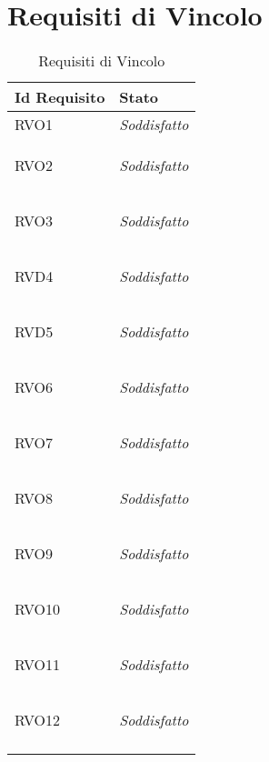 \section{Requisiti di Vincolo}
\normalsize
\begin{longtable}{|>{\centering}m{5cm}|m{5cm}<{\centering}|}
    \hline
    \textbf{Id Requisito} & \textbf{Stato}\\
    \hline
    \endhead
    \hypertarget{RVO1}{RVO1} & \textit{Soddisfatto}\\ \hline
   
    \hypertarget{RVO2}{RVO2} & \textit{Soddisfatto}\\ \hline
   
    \hypertarget{RVO3}{RVO3} & \textit{Soddisfatto}\\ \hline
   
    \hypertarget{RVD4}{RVD4} & \textit{Soddisfatto}\\ \hline
   
    \hypertarget{RVD5}{RVD5} & \textit{Soddisfatto}\\ \hline
   
    \hypertarget{RVO6}{RVO6} & \textit{Soddisfatto}\\ \hline
   
    \hypertarget{RVO7}{RVO7} & \textit{Soddisfatto}\\ \hline
   
    \hypertarget{RVO8}{RVO8} & \textit{Soddisfatto}\\ \hline
   
    \hypertarget{RVO9}{RVO9} & \textit{Soddisfatto}\\ \hline
   
    \hypertarget{RVO10}{RVO10} & \textit{Soddisfatto}\\ \hline
   
    \hypertarget{RVO11}{RVO11} & \textit{Soddisfatto}\\ \hline
   
    \hypertarget{RVO12}{RVO12} & \textit{Soddisfatto}\\ \hline
   
    \caption[Requisiti di Vincolo]{Requisiti di Vincolo}
    \label{tabella:req3}
\end{longtable}
\clearpage